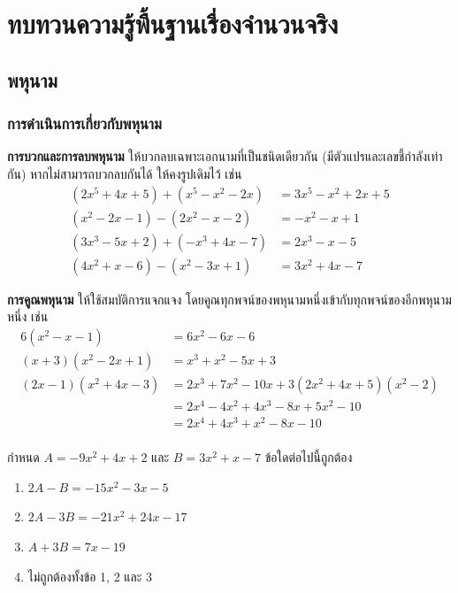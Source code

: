\chapter{ทบทวนความรู้พื้นฐานเรื่องจำนวนจริง}
\section{พหุนาม}
\subsection{การดำเนินการเกี่ยวกับพหุนาม}
\begin{conceptbox}
	\textbf{การบวกและการลบพหุนาม}  
	ให้บวกลบเฉพาะเอกนามที่เป็นชนิดเดียวกัน (มีตัวแปรและเลขชี้กำลังเท่ากัน)  
	หากไม่สามารถบวกลบกันได้ ให้คงรูปเดิมไว้ เช่น
	\begin{align*}
		\left(2x^5+4x+5\right)+\left(x^5-x^2-2x\right)
		&=3x^5-x^2+2x+5\\
		\left(x^2-2x-1\right)-\left(2x^2-x-2\right)
		&=-x^2-x+1\\
		\left(3x^3-5x+2\right)+\left(-x^3+4x-7\right)
		&=2x^3-x-5\\
		\left(4x^2+x-6\right)-\left(x^2-3x+1\right)
		&=3x^2+4x-7
	\end{align*}
\end{conceptbox}

\newpage
\begin{conceptbox}
	\textbf{การคูณพหุนาม}  
	ให้ใช้สมบัติการแจกแจง โดยคูณทุกพจน์ของพหุนามหนึ่งเข้ากับทุกพจน์ของอีกพหุนามหนึ่ง เช่น
	\begin{align*}
		6\left(x^2-x-1\right)
		&=6x^2-6x-6\\
		\left(x+3\right)\left(x^2-2x+1\right)
		&=x^3+x^2-5x+3\\
		\left(2x-1\right)\left(x^2+4x-3\right)
		&=2x^3+7x^2-10x+3
		\left(2x^2+4x+5\right)\left(x^2-2\right)\\
		&=2x^4-4x^2+4x^3-8x+5x^2-10\\
		&=2x^4+4x^3+x^2-8x-10\\
	\end{align*}
\end{conceptbox}

\begin{examplebox}
	กำหนด $A=-9 x^2+4 x+2$ และ $B=3 x^2+x-7$ ข้อใดต่อไปนี้ถูกต้อง
	\begin{enumerate}
		\item $2 A-B=-15 x^2-3 x-5$
		\item $2 A-3 B=-21 x^2+24 x-17$
		\item $A+3 B=7 x-19$
		\item ไม่ถูกต้องทั้งข้อ 1, 2 และ 3
	\end{enumerate}
\end{examplebox}

